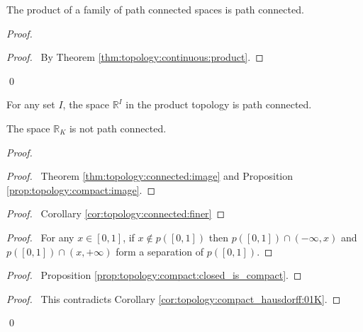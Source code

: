  \begin{prop}[AC]
   \label{prop:topology:path_conected:product}
The product of a family of path connected spaces is path connected.
\end{prop}

\begin{proof}
\pf
{}
\begin{proof}
  \pf\ By Theorem \ref{thm:topology:continuous:product}.
\end{proof}
\qed
\end{proof}

\begin{cor}
 For any set $I$, the space $\mathbb{R}^I$ in the product topology is path connected.
\end{cor}

\begin{prop}
The space $\mathbb{R}_K$ is not path connected.
\end{prop}

\begin{proof}
\pf
{}
 \begin{proof}
   \pf\ Theorem \ref{thm:topology:connected:image} and Proposition
\ref{prop:topology:compact:image}.
\end{proof}
 \begin{proof}
   \pf\ Corollary \ref{cor:topology:connected:finer}
 \end{proof}

 \begin{proof}
   \pf\ For any $x \in [0,1]$, if $x \notin p([0,1])$ then $p([0,1]) \cap
(-\infty, x)$ and $p([0,1]) \cap (x, + \infty)$ form a separation of $p([0,1])$.
\end{proof}
 \begin{proof}
   \pf\ Proposition \ref{prop:topology:compact:closed_is_compact}.
 \end{proof}
 \qedstep
 \begin{proof}
   \pf\ This contradicts Corollary \ref{cor:topology:compact_hausdorff:01K}.
 \end{proof}
 \qed
\end{proof}

